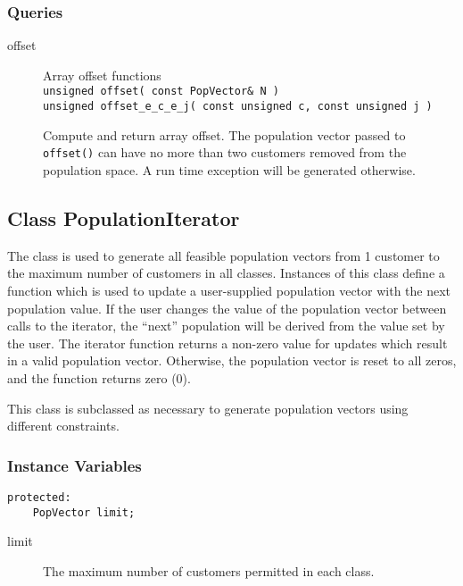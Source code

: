 \subsubsection{Queries}

\begin{description}
\item[offset] \texonly{---} Array offset functions\\
  \texttt{unsigned offset( const PopVector\& N )}\\
  \texttt{unsigned offset\_e\_c\_e\_j( const unsigned c, const unsigned j )}

  Compute and return array offset.  The population vector passed to
  \texttt{offset()} can have no more than two customers removed from the
  population space.  A run time exception will be generated otherwise.

\end{description}

\subsection{Class PopulationIterator}
\label{sec:popiter}

The  class is used to generate all feasible
population vectors from 1 customer to the maximum number of customers
in all classes.  Instances of this class define a function which is
used to update a user-supplied population vector with the next
population value.  If the user changes the value of the population
vector between calls to the iterator, the ``next'' population will be
derived from the value set by the user.  The iterator function returns
a non-zero value for updates which result in a valid population
vector.  Otherwise, the population vector is reset to all zeros, and
the function returns zero (0).

This class is subclassed as necessary to generate population vectors
using different constraints.

\subsubsection{Instance Variables}
\label{sec:popiter-ivars}
\begin{verbatim}
protected:
    PopVector limit;
\end{verbatim}

\begin{description}
\item[limit] \texonly{---} The maximum number of customers permitted
  in each class.
\end{description}

